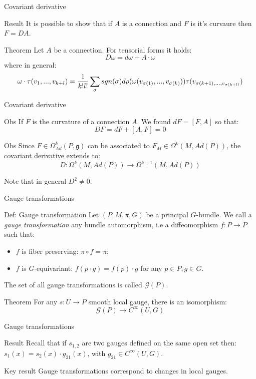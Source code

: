 \documentclass{beamer}
\begin{document}
\begin{frame}{Covariant derivative}
	\begin{block}{Result}
		It is possible to show that if $A$ is a connection and $F$ is it's curvaure then $F=DA$.
	\end{block}
	\begin{alertblock}{Theorem}
		Let $A$ be a connection. For tensorial forms it holds:
		$$D\omega=d\omega+A\cdot\omega $$
		where in general:
		$$\omega\cdot \tau(v_1,...,v_{k+l})={1\over k!l!}\sum_\sigma sgn(\sigma)d\rho(\omega(v_{\sigma(1)},...,v_{\sigma(k)}))\tau(v_{\sigma(k+1),...,v_{\sigma(k+l)}})$$
	\end{alertblock}
\end{frame}
\begin{frame}{Covariant derivative}
	\begin{exampleblock}{Obs}
		If $F$ is the curvature of a connection $A$. We found $dF=[F,A]$ so that:
		$$DF=dF+[A,F]=0$$
	\end{exampleblock}
	\begin{exampleblock}{Obs}
		Since $F\in\Omega^k_{Ad}(P,\mathfrak{g})$ can be associated to $F_M\in\Omega^k(M,Ad(P))$, the covariant derivative extends to:
		$$D:\Omega^k(M,Ad(P))\rightarrow \Omega^{k+1}(M,Ad(P))$$
	\end{exampleblock}
	Note that in general $D^2\neq 0$.
\end{frame}
\begin{frame}{Gauge transformations}
	\begin{exampleblock}{Def: Gauge transformation}
		Let $(P,M,\pi,G)$ be a principal $G$-bundle. We call a \textit{gauge transformation} any bundle automorphism, i.e a diffeomorphism $f:P\rightarrow P$ such that:
		\begin{itemize}
			\item $f$ is fiber preserving: $\pi\circ f=\pi$;
			\item $f$ is $G$-equivariant: $f(p\cdot g)=f(p)\cdot g$ for any $p\in P, g\in G$.
		\end{itemize}
		The set of all gauge transformations is called $\mathcal{G}(P)$.
	\end{exampleblock}
		\begin{alertblock}{Theorem}
		For any $s:U\rightarrow P$ smooth local gauge, there is an isomorphism:
		$$\mathcal{G}(P)\longrightarrow C^\infty(U,G)$$
	\end{alertblock}
\end{frame}
\begin{frame}{Gauge transformations}
	\begin{block}{Result}
		Recall that if $s_{1,2}$ are two gauges defined on the same open set then: $s_1(x)=s_2(x)\cdot g_{21}(x)$, with $g_{21}\in C^\infty(U,G)$.
	\end{block}
	\begin{alertblock}{Key result}
		Gauge transformations correspond to changes in local gauges.
	\end{alertblock}
\end{frame}
\end{document}
